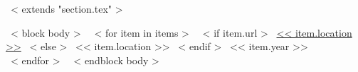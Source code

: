 ~< extends "section.tex" >~

~< block body >~
  ~< for item in items >~
    ~< if item.url >~
      \href{<< item.url >>}{<< item.location >>}
    ~< else >~
      << item.location >>
  ~< endif >~
  \hfill << item.year >> \\
  ~< endfor >~
~< endblock body >~
